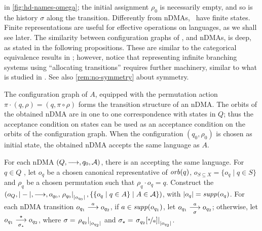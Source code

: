 in \cref{fig:hd-names-omega}; the initial assignment $\rho_0$ is necessarily empty, and so is the history $\sigma$ along the transition.
%
%
Differently from nDMAs, \hdmas\ have finite states. 
Finite representations are useful for effective operations on languages, as we shall see later. The similarity between configuration graphs of \hdmas, and nDMAs, is deep, as stated in the following propositions. These are similar to the categorical equivalence results in \cite{GadducciMM06,FioreS06}; however, notice that representing infinite branching systems using  ``allocating transitions'' requires further machinery, similar to what is studied in \cite{CianciaM10}. See also \cref{rem:no-symmetry} about symmetry.

%	
%

\begin{proposition}\label{pro:nset-to-nom}
 The configuration graph of $A$, equipped with the permutation action $\pi \cdot (q,\rho) = (q,\pi \circ \rho)$ forms the transition structure of an nDMA. The orbits of the obtained nDMA are in one to one correspondence with states in $Q$; thus the acceptance condition on states can be used as an acceptance condition on the orbits of the configuration graph. When the configuration $(q_0,\rho_0)$ is chosen as initial state, the obtained nDMA accepts the same language as $A$.
\end{proposition}
%

\begin{proposition}\label{prop:ndma-to-hdma}
For each nDMA $(Q,\overset{}{\longrightarrow},q_0,\mathcal{A})$, there is an \hdma{} accepting the same language.
For $q \in Q$ , let $o_q$ be a chosen canonical representative of $\mathit{orb}(q)$, $o_{S \subseteq X} = \{o_q \mid q \in S\}$ and $\rho_q$ be a chosen permutation such that $\rho_q \cdot o_q = q$.	Construct the \hdma\  $(o_Q,|-|,\overset{}{\underset{}{\longrightarrow}},o_{q_0},\left.\rho_{q_0}\right|_{|o_{q_0}|},\{ \{ o_q \mid q \in A\} \mid A \in \mathcal{A} \})$, 
%
with $|o_q| = \mathit{supp}(o_q)$. For each nDMA transition $o_{q_1} \overset{a}{\longrightarrow} o_{q_2}$, if $a \in \mathit{supp}(o_{q_1})$, let $o_{q_1} \overset{a}{\underset{\sigma}{\longrightarrow}} o_{q_2}$; otherwise, let $o_{q_1} \overset{\star}{\underset{\sigma_\star}{\longrightarrow}} o_{q_2}$, where $\sigma=\left.\rho_{q_2}\right|_{|o_{q_2}|}$ and $\sigma_\star = \left.\sigma_{q_2}[\nicefrac{*}{a}]\right|_{|o_{q_2}|}$.
\end{proposition}

